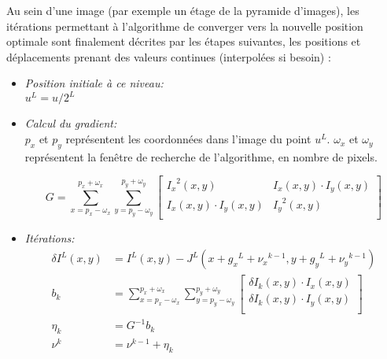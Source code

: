 Au sein d'une image (par exemple un étage de la pyramide d'images), les itérations permettant à l'algorithme de converger vers la nouvelle position optimale sont finalement décrites par les étapes suivantes, les positions et déplacements prenant des valeurs continues (interpolées si besoin) :

\begin{itemize} \label{sec:ch3_KLT_algo}
	\item{\emph{Position initiale à ce niveau:}\\}
	$u^L = u/{2^L}$ \\
	
	\item \emph{Calcul du gradient:\\}
	$p_x$ et $p_y$ représentent les coordonnées dans l'image du point $u^L$. $\omega_x$ et $\omega_y$ représentent la fenêtre de recherche de l'algorithme, en nombre de pixels.
	
	\begin{equation}
	G = \sum\limits_{x = p_x - \omega_x}^{p_x + \omega_x} \sum\limits_{y = p_y - \omega_y}^{p_y + \omega_y} 
	\left[ 
	\begin{array}{cc}
	{I_x}^2 (x,y) & I_x (x,y) \cdot I_y (x,y) \\
	I_x (x,y) \cdot I_y (x,y) & {I_y}^2 (x,y) \\
	\end{array}
	\right]
	\end{equation}
	
	\item{\emph{Itérations:}\\}
	\begin{align} \label{eq:ch3_KLT_iteration}
		\delta I^L(x,y) &= I^L(x,y) - J^L(x + {g_x}^L + {\nu_x}^{k-1}, y + {g_y}^L + {\nu_y}^{k-1}) \\
		b_k &= \sum\limits_{x = p_x - \omega_x}^{p_x + \omega_x} \sum\limits_{y = p_y - \omega_y}^{p_y + \omega_y} 
		\left[ 
		\begin{array}{c}
			\delta I_k (x,y) \cdot I_x (x,y) \\
			\delta I_k (x,y) \cdot I_y (x,y) \\
		\end{array}
		\right] \\
		\eta_k &= G^{-1} b_k \\
		\nu^k &= \nu^{k-1} + \eta_k
	\end{align}
\end{itemize}

